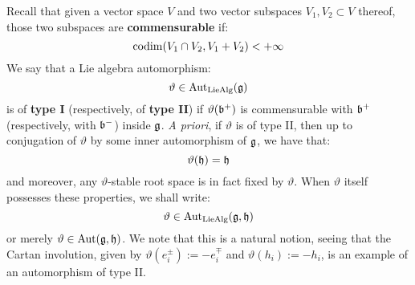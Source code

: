         Recall that given a vector space $V$ and two vector subspaces $V_1, V_2 \subset V$ thereof, those two subspaces are \textbf{commensurable} if:
            \begin{equation} \label{equation: commensurability}
                \operatorname{codim}(V_1 \cap V_2, V_1 + V_2) < +\infty
            \end{equation}
        We say that a Lie algebra automorphism:
            $$\vartheta \in \operatorname{Aut}_{\mathrm{Lie}\mathrm{Alg}}(\mathfrak{g})$$
        is of \textbf{type I} (respectively, of \textbf{type II}) if $\vartheta(\mathfrak{b}^+)$ is commensurable with $\mathfrak{b}^+$ (respectively, with $\mathfrak{b}^-$) inside $\mathfrak{g}$. \textit{A priori}, if $\vartheta$ is of type II, then up to conjugation of $\vartheta$ by some inner automorphism of $\mathfrak{g}$, we have that:
            $$\vartheta(\mathfrak{h}) = \mathfrak{h}$$
        and moreover, any $\vartheta$-stable root space is in fact fixed by $\vartheta$. When $\vartheta$ itself possesses these properties, we shall write:
            $$\vartheta \in \operatorname{Aut}_{\mathrm{Lie}\mathrm{Alg}}(\mathfrak{g}, \mathfrak{h})$$
        or merely $\vartheta \in \operatorname{Aut}(\mathfrak{g}, \mathfrak{h})$. We note that this is a natural notion, seeing that the Cartan involution, given by $\vartheta(e_i^{\pm}) := -e_i^{\mp}$ and $\vartheta(h_i) := -h_i$, is an example of an automorphism of type II. 